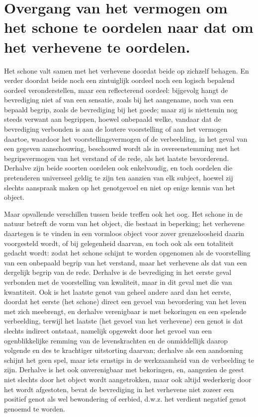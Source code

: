 
\section{Overgang van het vermogen om het schone te oordelen naar dat om het verhevene te oordelen.}

Het schone valt samen met het verhevene doordat beide op zichzelf behagen. En verder doordat beide noch een zintuiglijk oordeel noch een logisch bepalend oordeel veronderstellen, maar een reflecterend oordeel: bijgevolg hangt de bevrediging niet af van een sensatie, zoals bij het aangename, noch van een bepaald begrip, zoals de bevrediging bij het goede; maar zij is niettemin nog steeds verwant aan begrippen, hoewel onbepaald welke, vandaar dat de bevrediging verbonden is aan de loutere voorstelling of aan het vermogen daartoe, waardoor het voorstellingsvermogen of de verbeelding, in het geval van een gegeven aanschouwing, beschouwd wordt als in overeenstemming met het begripsvermogen van het verstand of de rede, als het laatste bevorderend.
Derhalve zijn beide soorten oordelen ook enkelvoudig, en toch oordelen die pretenderen universeel geldig te zijn ten aanzien van elk subject, hoewel zij slechts aanspraak maken op het genotgevoel en niet op enige kennis van het object.

Maar opvallende verschillen tussen beide treffen ook het oog. Het schone in de natuur betreft de vorm van het object, die bestaat in beperking; het verhevene daartegen is te vinden in een vormloos object voor zover grenzeloosheid daarin voorgesteld wordt, of bij gelegenheid daarvan, en toch ook als een totaliteit gedacht wordt: zodat het schone schijnt te worden opgenomen als de voorstelling van een onbepaald begrip van het verstand, maar het verhevene als dat van een dergelijk begrip van de rede.
Derhalve is de bevrediging in het eerste geval verbonden met de voorstelling van kwaliteit, maar in dit geval met die van kwantiteit. Ook is het laatste genot van geheel andere aard dan het eerste, doordat het eerste (het schone) direct een gevoel van bevordering van het leven met zich meebrengt, en derhalve verenigbaar is met bekoringen en een spelende verbeelding, terwijl het laatste (het gevoel van het verhevene) een genot is dat slechts indirect ontstaat, namelijk opgewekt door het gevoel van een ogenblikkelijke remming van de levenskrachten en de onmiddellijk daarop volgende en des te krachtiger uitstorting daarvan; derhalve als een aandoening schijnt het geen spel, maar iets ernstigs in de werkzaamheid van de verbeelding te zijn.
Derhalve is het ook onverenigbaar met bekoringen, en, aangezien de geest niet slechts door het object wordt aangetrokken, maar ook altijd wederkerig door het wordt afgestoten, bevat de bevrediging in het verhevene niet zozeer een positief genot als wel bewondering of eerbied, d.w.z. het verdient negatief genot genoemd te worden.

